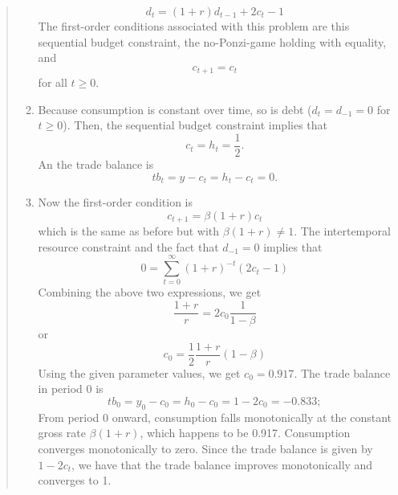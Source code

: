 \begin{exercise}
\begin{quote}
\begin{enumerate}
\[
d_t = (1+r) d_{t-1} +2c_t -1
\]
The first-order conditions associated with this problem are this sequential budget constraint, the no-Ponzi-game holding with equality, and 
\[
c_{t+1} = c_t 
\]
for all $t\ge0$. 
\item Because consumption is constant over time, so is debt ($d_t=d_{-1}=0$ for $t\ge0$). Then, the sequential budget constraint implies that 
\[c_t = h_t =\frac12.\]
An the trade balance is
\[tb_t = y-c_t = h_t-c_t=0.\]
\item Now the first-order condition is
\[c_{t+1} = \beta(1+r) c_t\]
which is the same as before but with $\beta(1+r)\neq 1$. 
The intertemporal resource constraint and the fact that $d_{-1}=0$ implies that
\[
0 = \sum_{t=0}^{\infty} (1+r)^{-t} 
(2c_t -1)
\]
Combining the above two expressions, we get
\[
\frac{1+r}r = 2c_0 \frac1{1-\beta}
\]
or 
\[
c_0 = \frac12 \frac{1+r}r (1-\beta)
\]
Using the given parameter values, we get
$c_0 = 0.917$. 
The trade balance in period 0 is
\[tb_0= y_0-c_0=h_0-c_0=1-2c_0=-0.833;\]
From period 0 onward, consumption falls monotonically at the constant gross rate $\beta(1+r)$, which happens to be 0.917. Consumption converges monotonically to zero.  Since the trade balance is given by $1-2c_t$, we have that the trade balance improves monotonically and converges to 1. 
\end{enumerate}
\end{quote}
\end{exercise}




